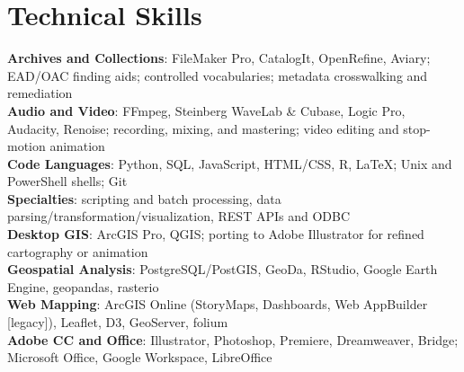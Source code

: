 \documentclass[letterpaper,10pt]{article}
\begin{document}
\section{Technical Skills}
 \begin{itemize}[leftmargin=0.15in, label={}]
    \small{\item{
     \textbf{Archives and Collections}{: FileMaker Pro, CatalogIt, OpenRefine, Aviary; EAD/OAC finding aids; controlled vocabularies; metadata crosswalking and remediation} \\
     \textbf{Audio and Video}{: FFmpeg, Steinberg WaveLab \& Cubase, Logic Pro, Audacity, Renoise; recording, mixing, and mastering; video editing and stop-motion animation} \\
     \textbf{Code Languages}{: Python, SQL, JavaScript, HTML/CSS, R, \LaTeX; Unix and PowerShell shells; Git} \\
     \textbf{\hspace{0.15in}Specialties}{: scripting and batch processing, data parsing/transformation/visualization, REST APIs and ODBC} \\
     \textbf{Desktop GIS}{: ArcGIS Pro, QGIS; porting to Adobe Illustrator for refined cartography or animation} \\
     \textbf{Geospatial Analysis}{: PostgreSQL/PostGIS, GeoDa, RStudio, Google Earth Engine, geopandas, rasterio} \\
     \textbf{Web Mapping}{: ArcGIS Online (StoryMaps, Dashboards, Web AppBuilder [legacy]), Leaflet, D3, GeoServer, folium} \\
     \textbf{Adobe CC and Office}{: Illustrator, Photoshop, Premiere, Dreamweaver, Bridge; Microsoft Office, Google Workspace, LibreOffice}
    }}
 \end{itemize}


\end{document}
